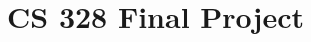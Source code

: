 \documentclass[10pt,letterpaper]{article}
\begin{document}
\section*{CS 328 Final Project}
\nocite{*}



\end{document}
